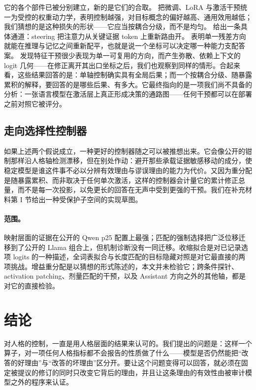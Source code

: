 \documentclass[UTF8,letterpaper,10pt,twocolumn]{ctexart}
\begin{document}
它的各个部件已被分别建立，新的是它们的合取。\citet{xu2026steering} 把微调、LoRA 与激活干预统一为受控的权重动力学，表明控制越强，对目标概念的偏好越高、通用效用越低；我们猜想的是这种损失的形状——它应当按耦合分级，而不是均匀。\citet{luo2026focus} 给出一条具体通道：steering 把注意力从关键证据 token 上重新路由开。\citet{hong2025reasoning} 表明单一残差方向就能在推理与记忆之间重新配平，也就是说一个坐标可以决定哪一种能力支配答案。\citet{hoang2026sae} 发现特征干预很少表现为单一可复用的方向，而产生弥散、依赖上下文的 logit 几何——在修正离开其出口坐标之后，我们也观察到同样的情形。合起来看，这些结果回答的是：单轴控制确实具有全局后果；而一个按耦合分级、随暴露累积的解释，要回答的是哪些后果、有多大。它最终指向的是一项我们尚不具备的分析：一张语言模型在激活层上真正形成决策的通路图——任何干预都可以在部署之前对照它被评分。

\subsection{走向选择性控制器}

如果上述两个假说成立，一种更好的控制器随之可以被推想出来。它会像公开的钳制那样沿人格轴检测漂移，但在别处作动：避开那些承载证据敏感移动的成分，使稳定模型是谁这件事不必以分辨有效理由与谬误理由的能力为代价。又因为重分配是随暴露累积、而非取决于任何单次激活，这样的控制器会计量它的累计修正总量，而不是每一次投影，以免更长的回答在无声中受到更强的干预。我们在补充材料第 I 节给出一种受保护子空间的实现草图。

\paragraph{范围。}
映射层面的证据在公开的 Qwen p25 配置上最强；匹配的强制选择把广泛位移迁移到了公开的 Llama 组合上，但机制诊断没有一同迁移。收缩拟合是对已记录选项 logits 的一种描述，全词表拟合与长度匹配的目标隐藏对照是对它最直接的两项挑战。增益重分配是以猜想的形式陈述的，本文并未检验它；跨条件探针、activation patching、剂量匹配的干预，以及 Assistant 方向之外的其他轴，都是对它的直接检验。

\section{结论}
\label{sec:conclusion-zh}

对人格的控制，一直是用人格层面的结果来认可的。我们提出的问题是：这样一个算子，对一项任何人格指标都不会报告的性质做了什么——模型是否仍然能把“改答的好理由”与“改答的坏理由”区分开。要让这个问题变得可以回答，就必须在固定被提议的修订的同时只改变它背后的理由，并且让这条理由的有效性由被审计模型之外的程序来认证。
\end{document}
